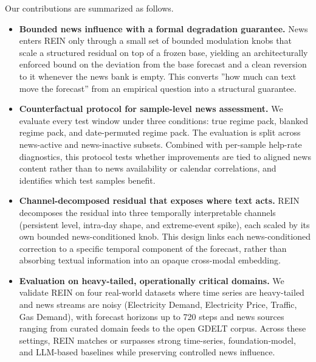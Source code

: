 \documentclass{article}
\newcommand{\method}{REIN\xspace}
\begin{document}
Our contributions are summarized as follows.
\begin{itemize}
    \item \textbf{Bounded news influence with a formal degradation guarantee.}
    News enters \method only through a small set of bounded modulation knobs that scale a structured residual on top of a frozen base, yielding an architecturally enforced bound on the deviation from the base forecast and a clean reversion to it whenever the news bank is empty. This converts ''how much can text move the forecast'' from an empirical question into a structural guarantee.

    \item \textbf{Counterfactual protocol for sample-level news assessment.}
    We evaluate every test window under three conditions: true regime pack, blanked regime pack, and date-permuted regime pack. The evaluation is split across news-active and news-inactive subsets. Combined with per-sample help-rate diagnostics, this protocol tests whether improvements are tied to aligned news content rather than to news availability or calendar correlations, and identifies which test samples benefit.

    \item \textbf{Channel-decomposed residual that exposes where text acts.}
    \method decomposes the residual into three temporally interpretable channels (persistent level, intra-day shape, and extreme-event spike), each scaled by its own bounded news-conditioned knob. This design links each news-conditioned correction to a specific temporal component of the forecast, rather than absorbing textual information into an opaque cross-modal embedding.

    \item \textbf{Evaluation on heavy-tailed, operationally critical domains.}
    We validate \method on four real-world datasets where time series are heavy-tailed and news streams are noisy (Electricity Demand, Electricity Price, Traffic, Gas Demand), with forecast horizons up to 720 steps and news sources ranging from curated domain feeds to the open GDELT corpus. Across these settings, \method matches or surpasses strong time-series, foundation-model, and LLM-based baselines while preserving controlled news influence.
\end{itemize}

\end{document}

